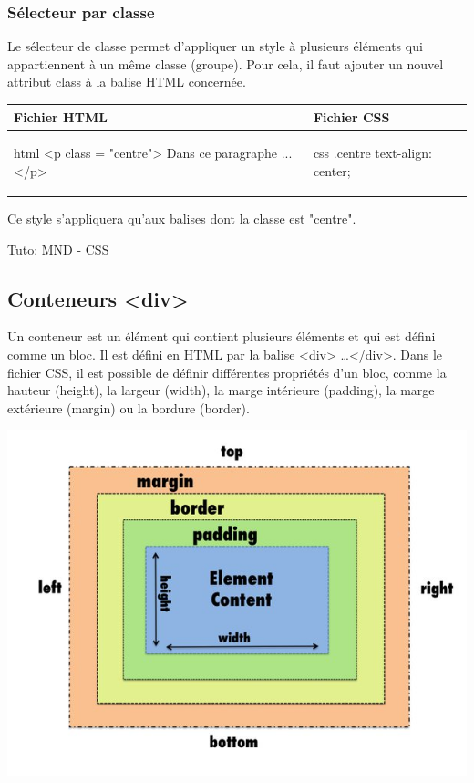 \documentclass[a4paper,11pt]{article}
\begin{document}
\subsubsection{Sélecteur par classe}
Le sélecteur de classe permet d'appliquer un style à plusieurs éléments qui appartiennent à un même classe (groupe). Pour cela, il faut ajouter un nouvel attribut class à la balise HTML concernée.\par

\begin{tabular}{|l|l|}
\hline
\centering Fichier HTML & Fichier CSS\tabularnewline
\hline
\begin{minipage}{1\textwidth}
\begin{code}{html}
<p class = "centre">
  Dans ce paragraphe ...
</p>
\end{code}
\end{minipage}&
\begin{minipage}{1\textwidth}
\begin{code}{css}
.centre{
  text-align: center;
}
\end{code}
\end{minipage}\tabularnewline
\hline
\end{tabular}\par
Ce style s'appliquera qu'aux balises dont la classe est "centre".

Tuto: \href{https://developer.mozilla.org/fr/docs/Learn/Getting_started_with_the_web/CSS_basics}{MND - CSS}


\subsection{Conteneurs <div>}
\begin{multicols}{2}
\begin{minipage}{1\textwidth}
Un conteneur est un élément qui contient plusieurs éléments et qui est défini comme un bloc.
Il est défini en HTML par la balise <div> \dots </div>. Dans le fichier CSS, il est possible de définir différentes propriétés d'un bloc, comme la hauteur (height), la largeur (width), la marge intérieure (padding), la marge extérieure (margin) ou la bordure (border).
\end{minipage}
\includegraphics[width= 1\textwidth]{images/conteneur.png}
\end{multicols}
\end{document}
